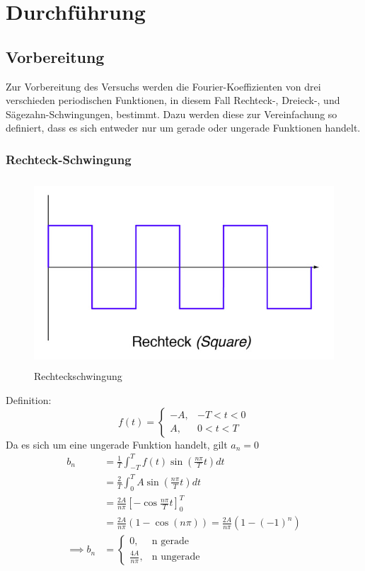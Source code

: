 \section{Durchführung}
\label{sec:Durchführung}

\subsection{Vorbereitung}
Zur Vorbereitung des Versuchs werden die Fourier-Koeffizienten von drei
verschieden periodischen Funktionen, in diesem Fall Rechteck-, Dreieck-,
und Sägezahn-Schwingungen, bestimmt. Dazu werden diese zur Vereinfachung so definiert,
dass es sich entweder nur um gerade oder ungerade Funktionen handelt.

\subsubsection{Rechteck-Schwingung}
\begin{figure}[H]
  \centering
  \includegraphics[height=7cm]{Rechteck.png}
  \caption{Rechteckschwingung \cite{Schwingungen}}
  \label{fig:reck}
\end{figure}
Definition:
\begin{equation}
  f(t)= \begin{cases}
         -A  , & -T < t < 0 \\
         A  , & 0 < t < T
      \end{cases}
\end{equation}
Da es sich um eine ungerade Funktion handelt, gilt $a_n = 0 $
\begin{align*}
  b_n &= \frac{1}{T} \int_{-T}^{T} f(t) \sin \left(\frac{n\pi}{T} t\right)dt \\
  &= \frac{2}{T} \int_0^T A \sin \left(\frac{n\pi}{T} t\right)dt \\
  &= \frac{2A}{n\pi} \left[-\cos \frac{n\pi}{T} t \right]^T_0 \\
  &= \frac{2A}{n\pi} (1-\cos (n\pi)) = \frac{2A}{n\pi}(1-(-1)^n) \\
  \implies b_n &= \begin{cases}
        0  , &\text{n gerade} \\
        \frac{4A}{n\pi} , &\text{n ungerade}
      \end{cases}
  \end{align*}

